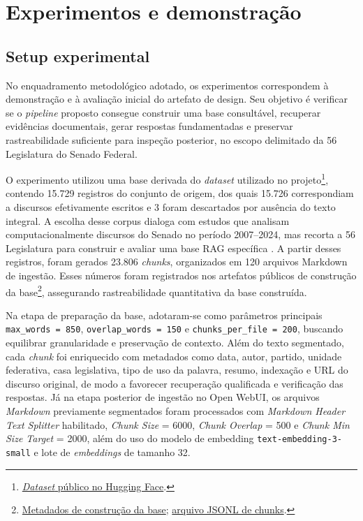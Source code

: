 \section{Experimentos e demonstração}

\subsection{Setup experimental}

No enquadramento metodológico adotado, os experimentos correspondem à demonstração e à avaliação inicial do artefato de design. Seu objetivo é verificar se o \textit{pipeline} proposto consegue construir uma base consultável, recuperar evidências documentais, gerar respostas fundamentadas e preservar rastreabilidade suficiente para inspeção posterior, no escopo delimitado da 56\textordfeminine{} Legislatura do Senado Federal.

O experimento utilizou uma base derivada do \textit{dataset} utilizado no projeto\footnote{\href{https://huggingface.co/datasets/fabriciosantana/discursos-senado-legislatura-56}{\textit{Dataset} público no Hugging Face}.}, contendo 15.729 registros do conjunto de origem, dos quais 15.726 correspondiam a discursos efetivamente escritos e 3 foram descartados por ausência do texto integral. A escolha desse corpus dialoga com estudos que analisam computacionalmente discursos do Senado no período 2007--2024, mas recorta a 56\textordfeminine{} Legislatura para construir e avaliar uma base RAG específica \parencite{blanco2025plenarioPalanqueEstudio,blanco2026letrasGraudas}. A partir desses registros, foram gerados 23.806 \textit{chunks}, organizados em 120 arquivos Markdown de ingestão. Esses números foram registrados nos artefatos públicos de construção da base\footnote{\href{https://github.com/fabriciosantana/mcdia/blob/main/05-iag/4-project/knowledge_openwebui/build_metadata.json}{Metadados de construção da base}; \href{https://github.com/fabriciosantana/mcdia/blob/main/05-iag/4-project/knowledge_openwebui/discursos_chunks.jsonl}{arquivo JSONL de chunks}.}, assegurando rastreabilidade quantitativa da base construída.

Na etapa de preparação da base, adotaram-se como parâmetros principais \texttt{max\_words = 850}, \texttt{overlap\_words = 150} e \texttt{chunks\_per\_file = 200}, buscando equilibrar granularidade e preservação de contexto. Além do texto segmentado, cada \textit{chunk} foi enriquecido com metadados como data, autor, partido, unidade federativa, casa legislativa, tipo de uso da palavra, resumo, indexação e URL do discurso original, de modo a favorecer recuperação qualificada e verificação das respostas. Já na etapa posterior de ingestão no Open WebUI, os arquivos \textit{Markdown} previamente segmentados foram processados com \textit{Markdown Header Text Splitter} habilitado, \textit{Chunk Size} = 6000, \textit{Chunk Overlap} = 500 e \textit{Chunk Min Size Target} = 2000, além do uso do modelo de embedding \texttt{text-embedding-3-small} e lote de \textit{embeddings} de tamanho 32.

